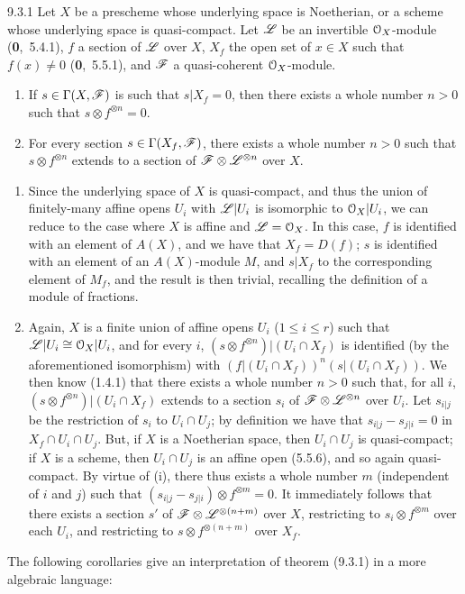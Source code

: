 \documentclass[../main.tex]{subfiles}
\begin{document}
\begin{cx}[Theorem]{9.3.1}
    Let $X$ be a prescheme whose underlying space is Noetherian, or a scheme whose underlying space is quasi-compact.
    Let $\mathscr{L}$ be an invertible $\mathcal{O}_X$-module {\normalfont(\textbf{0},~5.4.1)}, $f$ a section of $\mathscr{L}$ over $X$, $X_f$ the open set of $x\in X$ such that $f(x)\neq0$ {\normalfont(\textbf{0},~5.5.1)}, and $\mathscr{F}$ a quasi-coherent $\mathcal{O}_X$-module.
    \begin{enumerate}[label=\normalfont(\roman*)]
        \item If $s\in\Gamma(X,\mathscr{F})$ is such that $s|X_f=0$, then there exists a whole number $n>0$ such that $s\otimes f^{\otimes n}=0$.
        \item For every section $s\in\Gamma(X_f,\mathscr{F})$, there exists a whole number $n>0$ such that $s\otimes f^{\otimes n}$ extends to a section of $\mathscr{F}\otimes\mathscr{L}^{\otimes n}$ over $X$.
    \end{enumerate}
\end{cx}

\begin{enumerate}[label=\normalfont(\roman*)]
    \item Since the underlying space of $X$ is quasi-compact, and thus the union of finitely-many affine opens $U_i$ with $\mathscr{L}|U_i$ is isomorphic to $\mathcal{O}_X|U_i$, we can reduce to the case where $X$ is affine and $\mathscr{L}=\mathcal{O}_X$.
    In this case, $f$ is identified with an element of $A(X)$, and we have that $X_f=D(f)$; $s$ is identified with an element of an $A(X)$-module $M$, and $s|X_f$ to the corresponding element of $M_f$, and the result is then trivial, recalling the definition of a module of fractions.
    \item Again, $X$ is a finite union of affine opens $U_i$ ($1\leqslant i\leqslant r$) such that $\mathscr{L}|U_i\cong\mathcal{O}_X|U_i$, and for every $i$, $(s\otimes f^{\otimes n})|(U_i\cap X_f)$ is identified (by the aforementioned isomorphism) with $(f|(U_i\cap X_f))^n(s|(U_i\cap X_f))$.
    We then know (1.4.1) that there exists a whole number $n>0$ such that, for all $i$, $(s\otimes f^{\otimes n})|(U_i\cap X_f)$ extends to a section $s_i$ of $\mathscr{F}\otimes\mathscr{L}^{\otimes n}$ over $U_i$.
    Let $s_{i|j}$ be the restriction of $s_i$ to $U_i\cap U_j$; by definition we have that $s_{i|j}-s_{j|i}=0$ in $X_f\cap U_i\cap U_j$.
    But, if $X$ is a Noetherian space, then $U_i\cap U_j$ is quasi-compact; if $X$ is a scheme, then $U_i\cap U_j$ is an affine open (5.5.6), and so again quasi-compact.
    By virtue of (i), there thus exists a whole number $m$ (independent of $i$ and $j$) such that $(s_{i|j}-s_{j|i})\otimes f^{\otimes m}=0$.
    It immediately follows that there exists a section $s'$ of $\mathscr{F}\otimes\mathscr{L}^{\otimes(n+m)}$ over $X$, restricting to $s_i\otimes f^{\otimes m}$ over each $U_i$, and restricting to $s\otimes f^{\otimes(n+m)}$ over $X_f$.
\end{enumerate}
The following corollaries give an interpretation of theorem (9.3.1) in a more algebraic language:
\end{document}
